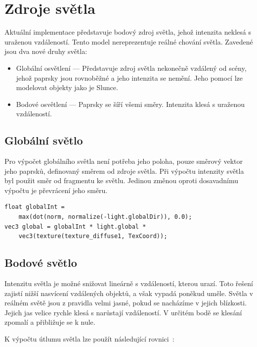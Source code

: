 \documentclass[thesis=M,czech]{FITthesis}[2019/12/23]
\begin{document}
\section{Zdroje světla}

Aktuální implementace představuje bodový zdroj světla, jehož intenzita neklesá s uraženou vzdáleností. Tento model nereprezentuje reálné chování světla. Zavedené jsou dva nové druhy světla:

\begin{itemize}
\item Globální osvětlení --- Představuje zdroj světla nekonečně vzdálený od scény, jehož paprsky jsou rovnoběžné a jeho intenzita se nemění. Jeho pomocí lze modelovat objekty jako je Slunce. 

\item Bodové osvětlení --- Paprsky se šíří všemi směry. Intenzita klesá s uraženou vzdáleností.
\end{itemize}

\subsection{Globální světlo}

Pro výpočet globálního světla není potřeba jeho poloha, pouze směrový vektor jeho paprsků, definovaný směrem od zdroje světla. Při výpočtu intenzity světla byl použit směr od fragmentu ke světlu. Jedinou změnou oproti dosavadnímu výpočtu je převrácení jeho směru.

\begin{verbatim}
float globalInt = 
    max(dot(norm, normalize(-light.globalDir)), 0.0);
vec3 global = globalInt * light.global * 
    vec3(texture(texture_diffuse1, TexCoord));
\end{verbatim}

\subsection{Bodové světlo}

Intenzitu světla je možné snižovat lineárně s vzdáleností, kterou urazí. Toto řešení zajistí nižší nasvícení vzdálených objektů, a však vypadá poněkud uměle. Světla v reálném světě jsou z pravidla velmi jasné, pokud se nacházíme v jejich blízkosti. Jejich jas velice rychle klesá s narůstají vzdáleností. V určitém bodě se klesání zpomalí a přibližuje se k nule.

K výpočtu útlumu světla lze použít následující rovnici~\cite{lopgl_light_casters}:
\end{document}
